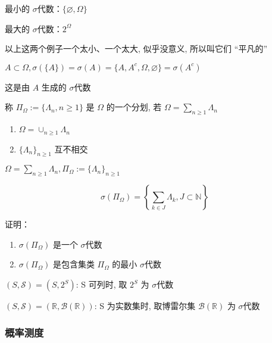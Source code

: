 \begin{example}
    最小的 $\sigma$代数：$\{\varnothing, \Omega\}$ 

    最大的 $\sigma$代数：$2^{\Omega}$
\end{example}

以上这两个例子一个太小、一个太大, 似乎没意义, 所以叫它们 “平凡的”

\begin{example}
    $A\subset \Omega, \sigma(\{A\})=\sigma(A)=\{A, A^c, \Omega, \varnothing\}=\sigma(A^c)$

    这是由 $A$ 生成的 $\sigma$代数
\end{example}

\begin{definition}[划分/分割]\label{def:partition}
    称 $\Pi_{\Omega}:= \{\Lambda_n, n\geq 1\}$ 是 $\Omega$ 的一个分划, 若 $\Omega=\sum_{n\geq 1}\Lambda_n$

    \begin{enumerate}
        \item $\Omega=\cup_{n\geq 1}\Lambda_n$
        \item $\{\Lambda_n\}_{n\geq 1}$ 互不相交
    \end{enumerate}
\end{definition}

\begin{example}
    $\Omega=\sum_{n\geq 1}\Lambda_n, \Pi_{\Omega}:=\{\Lambda_n\}_{n\geq 1}$

    \[
    \sigma(\Pi_{\Omega})=\left \{\sum_{k\in J}\Lambda_k, J\subset \mathbb{N}\right \}
    \]
\end{example}

\begin{problem}[作业1-1]
    证明：\begin{enumerate}
        \item $\sigma(\Pi_{\Omega})$ 是一个 $\sigma$代数
        \item $\sigma(\Pi_{\Omega})$ 是包含集类 $\Pi_{\Omega}$ 的最小 $\sigma$代数
    \end{enumerate}
\end{problem}


$(S,\mathcal{S})=(S,2^S)$: S 可列时, 取 $2^S$ 为 $\sigma$代数

$(S,\mathcal{S})=(\mathbb{R},\mathcal{B}(\mathbb{R}))$: S 为实数集时, 取博雷尔集 $\mathcal{B}(\mathbb{R})$ 为 $\sigma$代数


\subsubsection{概率测度}

